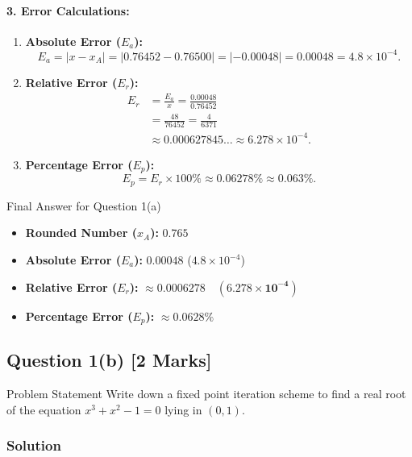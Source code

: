 \documentclass[11pt,a4paper]{article}
\begin{document}
\paragraph{3. Error Calculations:}
\begin{enumerate}[label=(\alph*)]
    \item \textbf{Absolute Error ($E_a$):}
    \[
    E_a = |x - x_A| = |0.76452 - 0.76500| = |-0.00048| = 0.00048 = 4.8 \times 10^{-4}.
    \]
    \item \textbf{Relative Error ($E_r$):}
    \begin{align*}
    E_r &= \frac{E_a}{x} = \frac{0.00048}{0.76452} \\
        &= \frac{48}{76452} = \frac{4}{6371} \\
        &\approx 0.000627845 \dots \approx 6.278 \times 10^{-4}.
    \end{align*}
    \item \textbf{Percentage Error ($E_p$):}
    \[
    E_p = E_r \times 100\% \approx 0.06278\% \approx 0.063\%.
    \]
\end{enumerate}

\begin{answerbox}{Final Answer for Question 1(a)}
\begin{itemize}[leftmargin=1.5cm]
    \item \textbf{Rounded Number ($x_A$):} $0.765$
    \item \textbf{Absolute Error ($E_a$):} $0.00048$ ($4.8 \times 10^{-4}$)
    \item \textbf{Relative Error ($E_r$):} $\mathbf{\approx 0.0006278 \quad (6.278 \times 10^{-4})}$
    \item \textbf{Percentage Error ($E_p$):} $\approx 0.0628\%$
\end{itemize}
\end{answerbox}

\vspace{0.4cm}

\subsection*{Question 1(b) \hfill [2 Marks]}

\begin{questionbox}{Problem Statement}
Write down a fixed point iteration scheme to find a real root of the equation $x^3 + x^2 - 1 = 0$ lying in $(0,1)$.
\end{questionbox}

\subsubsection*{Solution}
\end{document}
